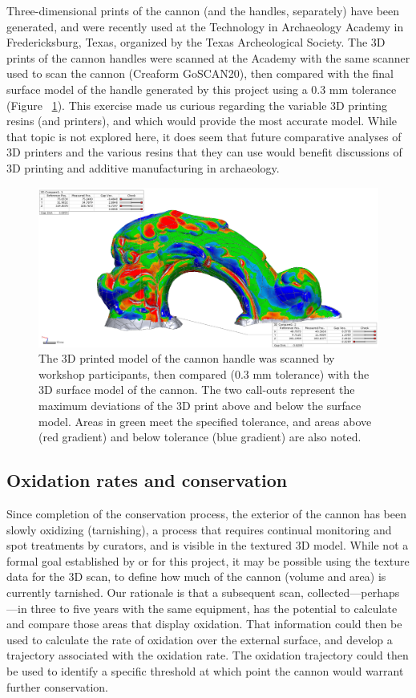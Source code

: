 \documentclass[review]{elsarticle}
\begin{document}
Three-dimensional prints of the cannon (and the handles, separately) have been generated, and were recently used at the Technology in Archaeology Academy in Fredericksburg, Texas, organized by the Texas Archeological Society. The 3D prints of the cannon handles were scanned at the Academy with the same scanner used to scan the cannon (Creaform GoSCAN20), then compared with the final surface model of the handle generated by this project using a 0.3 mm tolerance (Figure ~\ref{fig:Fig6}). This exercise made us curious regarding the variable 3D printing resins (and printers), and which would provide the most accurate model. While that topic is not explored here, it does seem that future comparative analyses of 3D printers and the various resins that they can use would benefit discussions of 3D printing and additive manufacturing in archaeology.

\begin{figure}[ht]\centering
\includegraphics[width=\linewidth]{CannonCompare}
\caption{The 3D printed model of the cannon handle was scanned by workshop participants, then compared (0.3 mm tolerance) with the 3D surface model of the cannon. The two call-outs represent the maximum deviations of the 3D print above and below the surface model. Areas in green meet the specified tolerance, and areas above (red gradient) and below tolerance (blue gradient) are also noted.}
\label{fig:Fig6}
\end{figure}

\subsection*{Oxidation rates and conservation}

Since completion of the conservation process, the exterior of the cannon has been slowly oxidizing (tarnishing), a process that requires continual monitoring and spot treatments by curators, and is visible in the textured 3D model. While not a formal goal established by or for this project, it may be possible using the texture data for the 3D scan, to define how much of the cannon (volume and area) is currently tarnished. Our rationale is that a subsequent scan, collected---perhaps---in three to five years with the same equipment, has the potential to calculate and compare those areas that display oxidation. That information could then be used to calculate the rate of oxidation over the external surface, and develop a trajectory associated with the oxidation rate. The oxidation trajectory could then be used to identify a specific threshold at which point the cannon would warrant further conservation. 
\end{document}
